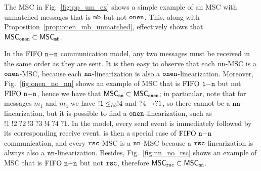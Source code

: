 The MSC in Fig.~\ref{fig:pp_um_ex} shows a simple example of an MSC with unmatched messages that is $\mathtt{mb}$ but not $\mathtt{onen}$. This, along with Proposition~\ref{prop:onen_mb_unmatched}, effectively shows that $\mathsf{MSC}_{\mathtt{onen}} \subset \mathsf{MSC}_{\mathtt{mb}}$.

 

In the $\text{FIFO } \mathtt{n\mathsf{-}n}$ communication model, any two messages must be received in the same order as they are sent. It is then easy to observe that each $\mathtt{nn}$-MSC is a $\mathtt{onen}$-MSC, because each $\mathtt{nn}$-linearization is also a $\mathtt{onen}$-linearization. Moreover, Fig.~\ref{fig:onen_no_nn} shows an example of MSC that is $\text{FIFO } \mathtt{1\mathsf{-}n}$ but not $\text{FIFO } \mathtt{n\mathsf{-}n}$, hence we have that $\mathsf{MSC}_{\mathtt{nn}} \subset \mathsf{MSC}_{\mathtt{onen}}$; in particular, note that for messages $m_1$ and $m_4$ we have $!1 \leq_{hb} !4$ and $?4 \to ?1$, so there cannot be a $\mathtt{nn}$-linearization, but it is possible to find a $\mathtt{onen}$-linearization, such as $!1\;!2\;?2\;!3\;?3\;!4\;?4\;?1$. In the \rsc model, every send event is immediately followed by its corresponding receive event. \rsc is then  a special case of $\text{FIFO } \mathtt{n\mathsf{-}n}$ communication, and every $\mathtt{rsc}$-MSC is a $\mathtt{nn}$-MSC because a $\mathtt{rsc}$-linearization is always also a $\mathtt{nn}$-linearization. Besides, Fig.~\ref{fig:nn_no_rsc} shows an example of MSC that is $\text{FIFO } \mathtt{n\mathsf{-}n}$ but not $\mathtt{rsc}$, therefore $\mathsf{MSC}_{\mathtt{rsc}} \subset \mathsf{MSC}_{\mathtt{nn}}$.
